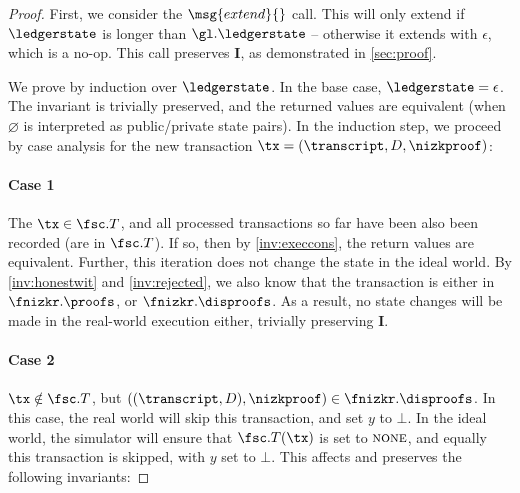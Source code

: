 \begin{proof}
  First, we consider the $\msg{extend}{}$ call. This will only extend if
  $\ledgerstate$ is longer than $\gl.\ledgerstate$ -- otherwise it extends with
  $\epsilon$, which is a no-op. This call preserves $\boldsymbol I$, as
  demonstrated in \autoref{sec:proof}.

  We prove by induction over $\ledgerstate$. In the base case, $\ledgerstate =
  \epsilon$. The invariant is trivially preserved, and the returned values are
  equivalent (when $\varnothing$ is interpreted as public/private state pairs).
  In the induction step, we proceed by case analysis for the new transaction
  $\tx = (\transcript, D, \nizkproof)$:

  \paragraph{Case 1} The $\tx \in \fsc.T$, and all processed transactions so
  far have been also been recorded (are in $\fsc.T$). If so, then by
  \ref{inv:execcons}, the return values are equivalent. Further, this iteration
  does not change the state in the ideal world. By \ref{inv:honestwit} and
  \ref{inv:rejected}, we also know that the transaction is either in
  $\fnizkr.\proofs$, or $\fnizkr.\disproofs$. As a result, no state changes will
  be made in the real-world execution either, trivially preserving $\boldsymbol
  I$.

  \paragraph{Case 2} $\tx \notin \fsc.T$, but $((\transcript,
  D), \nizkproof) \in \fnizkr.\disproofs$. In this case, the real
  world will skip this transaction, and set $y$ to $\bot$. In the ideal world,
  the simulator will ensure that $\fsc.T(\tx)$ is set to
  $\textsc{none}$, and equally this transaction is skipped, with $y$ set to
  $\bot$. This affects and preserves the following invariants:


\end{proof}
